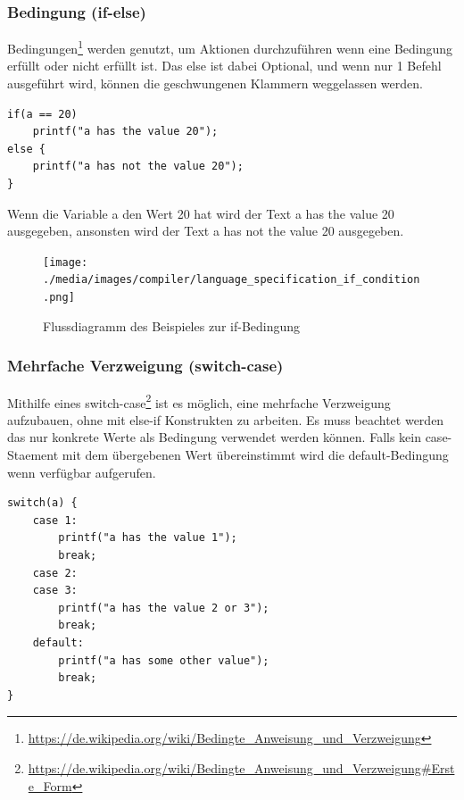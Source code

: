 \subsubsection{Bedingung (if-else)}

Bedingungen\footnote{\url{https://de.wikipedia.org/wiki/Bedingte_Anweisung_und_Verzweigung}} werden genutzt, um Aktionen durchzuf\"uhren wenn eine Bedingung erf\"ullt oder nicht erf\"ullt ist. Das else ist dabei Optional, und wenn nur 1 Befehl ausgef\"uhrt wird, k\"onnen die geschwungenen Klammern weggelassen werden.


\begin{lstlisting}[language=CMM]
if(a == 20)
	printf("a has the value 20");
else {
	printf("a has not the value 20");
}
\end{lstlisting}

Wenn die Variable a den Wert 20 hat wird der Text \glqq{}a has the value 20\grqq{} ausgegeben, ansonsten wird der Text \glqq{}a has not the value 20\grqq{} ausgegeben.

\begin{figure}[h]
\centering
\texttt{[image: ./media/images/compiler/language\_specification\_if\_condition.png]}
\caption{Flussdiagramm des Beispieles zur if-Bedingung}
\label{language_specification_if_condition}
\end{figure}

\newpage
\subsubsection{Mehrfache Verzweigung (switch-case)}

Mithilfe eines switch-case\footnote{\url{https://de.wikipedia.org/wiki/Bedingte_Anweisung_und_Verzweigung\#Erste_Form}} ist es m\"oglich, eine mehrfache Verzweigung aufzubauen, ohne mit else-if Konstrukten zu arbeiten. Es muss beachtet werden das nur konkrete Werte als Bedingung verwendet werden k\"onnen. Falls kein case-Staement mit dem \"ubergebenen Wert \"ubereinstimmt wird die default-Bedingung wenn verf\"ugbar aufgerufen.


\begin{lstlisting}[language=CMM]
switch(a) {
	case 1:
		printf("a has the value 1");
		break;
	case 2:
	case 3:
		printf("a has the value 2 or 3");
		break;
	default:
		printf("a has some other value");
		break;
}
\end{lstlisting}

